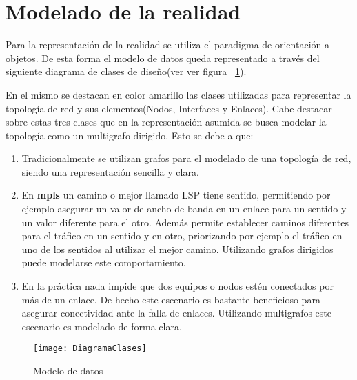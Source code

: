 
\section[Modelado de la realidad]{Modelado de la realidad}

Para la representaci\'on de la realidad se utiliza el paradigma de orientaci\'on a objetos. De esta forma el modelo de datos queda representado a través del siguiente diagrama de clases de diseño(ver ver figura ~\ref{fig:ModeloDeDatos}).

En el mismo se destacan en color amarillo las clases utilizadas para representar la topolog\'ia de red y sus elementos(Nodos, Interfaces y Enlaces). Cabe destacar sobre estas tres clases que en la representaci\'on asumida se busca modelar la topolog\'ia como un multigrafo dirigido. Esto se debe a que:

\begin{enumerate}
\item Tradicionalmente se utilizan grafos para el modelado de una topolog\'ia de red, siendo una representaci\'on sencilla y clara.

\item En \textbf{mpls} un camino o mejor llamado LSP tiene sentido, permitiendo por ejemplo asegurar un valor de ancho de banda en un enlace para un sentido y un valor diferente para el otro. Adem\'as permite establecer caminos diferentes para el tr\'afico en un sentido y en otro, priorizando por ejemplo el tr\'afico  en uno de los sentidos al utilizar el mejor camino. Utilizando grafos dirigidos puede modelarse este comportamiento.

\item En la pr\'actica nada impide que dos equipos o nodos est\'en conectados por m\'as de un enlace. De hecho este escenario es bastante beneficioso para asegurar conectividad ante la falla de enlaces. Utilizando multigrafos este escenario es modelado de forma clara.
  
\end{enumerate}

\begin{figure}[ht!] 
\centering    
\texttt{[image: DiagramaClases]}
\caption[Modelo de datos]{Modelo de datos}
\label{fig:ModeloDeDatos}
\end{figure}

